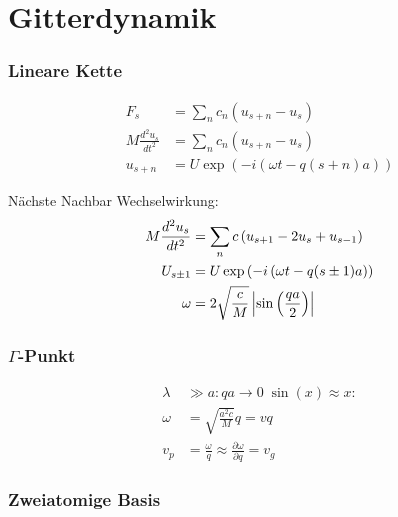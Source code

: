 \section{Gitterdynamik}


\subsubsection*{Lineare Kette}

\begin{equation*}
    \begin{aligned}
        F_s &= \sum_n c_n \left(u_{s+n} - u_s\right) \\
        M \frac{d^2 u_s}{dt^2} &= \sum_n c_n \left(u_{s+n} - u_s\right) \\
        u_{s+n} &= U \exp \left(-i\left(\omega t - q (s+n)a\right)\right)
    \end{aligned}
\end{equation*}

Nächste Nachbar Wechselwirkung:
\begin{equation*}
    \begin{aligned}
        M \frac{d^2 u_s}{dt^2} &= \sum_n c \left(u_{s+1} -2u_s + u_{s-1}\right) \\
        U_{s \pm 1} &= U \exp \left(-i \left(\omega t - q (s \pm 1)a\right)\right) \\
        \omega &= 2 \sqrt{\frac{c}{M}} \left\vert\sin \left(\frac{qa}{2}\right)\right\vert
    \end{aligned}
\end{equation*}

\subsubsection*{$\Gamma$-Punkt}
\begin{equation*}
    \begin{aligned}
        \lambda &\gg a: qa \rightarrow 0 \; \sin(x) \approx x: \\
        \omega &= \sqrt{\frac{a^2c}{M}}q = v q \\
        v_p &= \frac{\omega}{q} \approx \frac{\partial \omega}{\partial q} = v_g
    \end{aligned}
\end{equation*}

\subsubsection*{Zweiatomige Basis}

